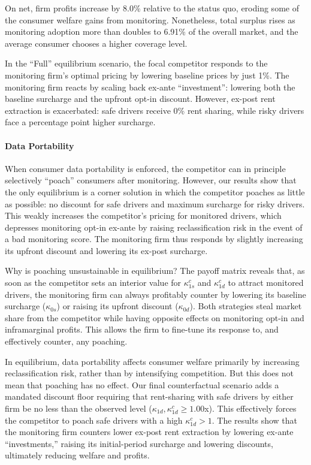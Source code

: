 On net, firm profits increase by 8.0\% relative to the status quo, eroding some of the consumer welfare gains from monitoring. Nonetheless, total surplus rises as monitoring adoption more than doubles to 6.91\% of the overall market, and the average consumer chooses a higher coverage level.

In the ``Full'' equilibrium scenario, the focal competitor responds to the monitoring firm's optimal pricing by lowering baseline prices by just 1\%. The monitoring firm reacts by scaling back ex-ante ``investment'': lowering both the baseline surcharge and the upfront opt-in discount. However, ex-post rent extraction is exacerbated: safe drivers receive 0\% rent sharing, while risky drivers face a percentage point higher surcharge.

\paragraph{Data Portability} When consumer data portability is enforced, the competitor can in principle selectively ``poach'' consumers after monitoring. However, our results show that the only equilibrium is a corner solution in which the competitor poaches as little as possible: no discount for safe drivers and maximum surcharge for risky drivers. This weakly increases the competitor's pricing for monitored drivers, which depresses monitoring opt-in ex-ante by raising reclassification risk in the event of a bad monitoring score. The monitoring firm thus responds by slightly increasing its upfront discount and lowering its ex-post surcharge.

Why is poaching unsustainable in equilibrium? The payoff matrix reveals that, as soon as the competitor sets an interior value for $\kappa^c_{1s}$ and $\kappa^c_{1d}$ to attract monitored drivers, the monitoring firm can always profitably counter by lowering its baseline surcharge ($\kappa_{0s}$) or raising its upfront discount ($\kappa_{0d}$). Both strategies steal market share from the competitor while having opposite effects on monitoring opt-in and inframarginal profits. This allows the firm to fine-tune its response to, and effectively counter, any poaching.

In equilibrium, data portability affects consumer welfare primarily by increasing reclassification risk, rather than by intensifying competition. But this does not mean that poaching has no effect. Our final counterfactual scenario adds a mandated discount floor requiring that rent-sharing with safe drivers by either firm be no less than the observed level ($\kappa_{1d}, \kappa^{c}_{1d} \geq 1.00$x). This effectively forces the competitor to poach safe drivers with a high $\kappa^c_{1d}>1$. The results show that the monitoring firm counters lower ex-post rent extraction by lowering ex-ante ``investments,'' raising its initial-period surcharge and lowering discounts, ultimately reducing welfare and profits.

